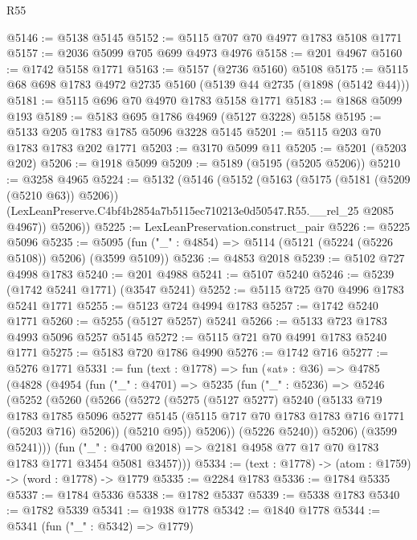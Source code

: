 \begin{lexlean}{R55}
\begin{coremodule}
@5146 := @5138 @5145
@5152 := @5115 @707 @70 @4977 @1783 @5108 @1771
@5157 := @2036 @5099 @705 @699 @4973 @4976
@5158 := @201 @4967
@5160 := @1742 @5158 @1771
@5163 := @5157 (@2736 @5160) @5108
@5175 := @5115 @68 @698 @1783 @4972 @2735 @5160 (@5139 @44 @2735 (@1898 (@5142 @44)))
@5181 := @5115 @696 @70 @4970 @1783 @5158 @1771
@5183 := @1868 @5099 @193
@5189 := @5183 @695 @1786 @4969 (@5127 @3228) @5158
@5195 := @5133 @205 @1783 @1785 @5096 @3228 @5145
@5201 := @5115 @203 @70 @1783 @1783 @202 @1771
@5203 := @3170 @5099 @11
@5205 := @5201 (@5203 @202)
@5206 := @1918 @5099
@5209 := @5189 (@5195 (@5205 @5206))
@5210 := @3258 @4965
@5224 := @5132
    (@5146
      (@5152
        (@5163
          (@5175 (@5181 (@5209 (@5210 @63)) @5206))
          (LexLeanPreserve.C4bf4b2854a7b5115ec710213e0d50547.R55.__rel_25 @2085 @4967))
        @5206))
@5225 := LexLeanPreservation.construct_pair
@5226 := @5225 @5096
@5235 := @5095 (fun ("_" : @4854) => @5114 (@5121 (@5224 (@5226 @5108)) @5206) (@3599 @5109))
@5236 := @4853 @2018
@5239 := @5102 @727 @4998 @1783
@5240 := @201 @4988
@5241 := @5107 @5240
@5246 := @5239 (@1742 @5241 @1771) (@3547 @5241)
@5252 := @5115 @725 @70 @4996 @1783 @5241 @1771
@5255 := @5123 @724 @4994 @1783
@5257 := @1742 @5240 @1771
@5260 := @5255 (@5127 @5257) @5241
@5266 := @5133 @723 @1783 @4993 @5096 @5257 @5145
@5272 := @5115 @721 @70 @4991 @1783 @5240 @1771
@5275 := @5183 @720 @1786 @4990
@5276 := @1742 @716
@5277 := @5276 @1771
@5331 := fun (text : @1778) =>
  fun («at» : @36) =>
  @4785
    (@4828
      (@4954
        (fun ("_" : @4701) =>
        @5235
          (fun ("_" : @5236) =>
          @5246
            (@5252
              (@5260
                (@5266
                  (@5272
                    (@5275
                      (@5127 @5277)
                      @5240
                      (@5133
                        @719
                        @1783
                        @1785
                        @5096
                        @5277
                        @5145
                        (@5115 @717 @70 @1783 @1783 @716 @1771 (@5203 @716) @5206))
                      (@5210 @95))
                    @5206))
                (@5226 @5240))
              @5206)
            (@3599 @5241)))
        (fun ("_" : @4700 @2018) => @2181 @4958 @77 @17 @70 @1783 @1783 @1771 @3454 @5081 @3457)))
@5334 := (text : @1778) -> (atom : @1759) -> (word : @1778) -> @1779
@5335 := @2284 @1783
@5336 := @1784 @5335
@5337 := @1784 @5336
@5338 := @1782 @5337
@5339 := @5338 @1783
@5340 := @1782 @5339
@5341 := @1938 @1778
@5342 := @1840 @1778
@5344 := @5341 (fun ("_" : @5342) => @1779)

\end{coremodule}
\end{lexlean}

